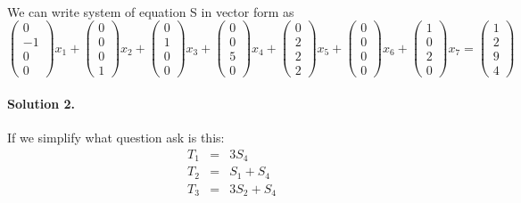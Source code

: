 \documentclass[11pt]{article}
\begin{document}
\paragraph{}We can write system of equation S in vector form as
\[
\begin{pmatrix}
	0\\
	-1\\
	0\\
	0
\end{pmatrix}x_1
+
\begin{pmatrix}
	0\\
	0\\
	0\\
	1
\end{pmatrix}x_2
+
\begin{pmatrix}
	0\\
	1\\
	0\\
	0
\end{pmatrix}x_3
+
\begin{pmatrix}
	0\\
	0\\
	5\\
	0	
\end{pmatrix}x_4
+
\begin{pmatrix}
	0\\
	2\\
	2\\
	2
\end{pmatrix}x_5
+
\begin{pmatrix}
	0\\
	0\\
	0\\
	0
\end{pmatrix}x_6
+
\begin{pmatrix}
	1\\
	0\\
	2\\
	0
\end{pmatrix}x_7
=
\begin{pmatrix}
	1\\
	2\\
	9\\
	4
\end{pmatrix}
\]
\paragraph{Solution 2.} If we simplify what question ask is this:
\begin{eqnarray*}
T_1&=&3S_4
\\T_2&=&S_1+S_4
\\T_3&=&3S_2+S_4
\end{eqnarray*}
\end{document}
